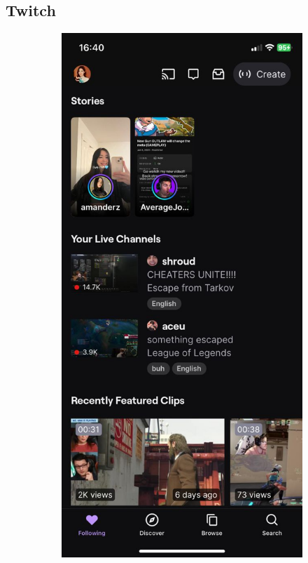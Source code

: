 \subsection{Twitch}
\begin{figure} [h]
    \centering
    \begin{subfigure}{.3\linewidth}
      \centering
      \includegraphics[width = \linewidth]{mainmatter/images/twitch1.jpg}

\end{subfigure}
\end{figure}
